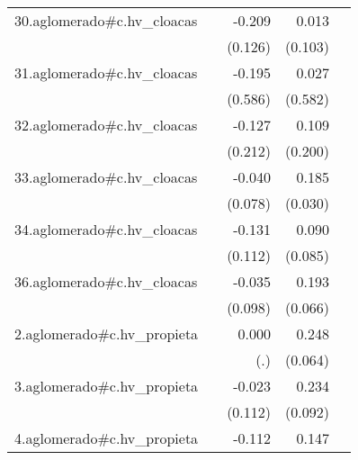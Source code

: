 {\begin{longtable}{l*{4}{D{.}{.}{-1}}}
\addlinespace
30.aglomerado#c.hv\_cloacas&                     &      -0.209         &       0.013         &                     \\
            &                     &     (0.126)         &     (0.103)         &                     \\
\addlinespace
31.aglomerado#c.hv\_cloacas&                     &      -0.195         &       0.027         &                     \\
            &                     &     (0.586)         &     (0.582)         &                     \\
\addlinespace
32.aglomerado#c.hv\_cloacas&                     &      -0.127         &       0.109         &                     \\
            &                     &     (0.212)         &     (0.200)         &                     \\
\addlinespace
33.aglomerado#c.hv\_cloacas&                     &      -0.040         &       0.185\sym{***}&                     \\
            &                     &     (0.078)         &     (0.030)         &                     \\
\addlinespace
34.aglomerado#c.hv\_cloacas&                     &      -0.131         &       0.090         &                     \\
            &                     &     (0.112)         &     (0.085)         &                     \\
\addlinespace
36.aglomerado#c.hv\_cloacas&                     &      -0.035         &       0.193\sym{**} &                     \\
            &                     &     (0.098)         &     (0.066)         &                     \\
\addlinespace
2.aglomerado#c.hv\_propieta&                     &       0.000         &       0.248\sym{***}&                     \\
            &                     &         (.)         &     (0.064)         &                     \\
\addlinespace
3.aglomerado#c.hv\_propieta&                     &      -0.023         &       0.234\sym{*}  &                     \\
            &                     &     (0.112)         &     (0.092)         &                     \\
\addlinespace
4.aglomerado#c.hv\_propieta&                     &      -0.112         &       0.147\sym{**} &                     \\

\end{longtable}}

